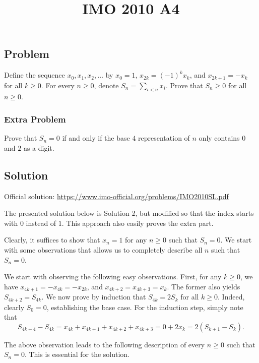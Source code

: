 \documentclass{article}
\title{IMO 2010 A4}
\author{}
\date{}
\begin{document}
\maketitle



\subsection*{Problem}

Define the sequence $x_0, x_1, x_2, \ldots$ by $x_0 = 1$, $x_{2k} = (-1)^k x_k$, and $x_{2k + 1} = -x_k$ for all $k \geq 0$.
For every $n \geq 0$, denote $S_n = \displaystyle \sum_{i < n} x_i$.
Prove that $S_n \geq 0$ for all $n \geq 0$.


\subsubsection*{Extra Problem}

Prove that $S_n = 0$ if and only if the base $4$ representation of $n$ only contains $0$ and $2$ as a digit.



\subsection*{Solution}

Official solution: \url{https://www.imo-official.org/problems/IMO2010SL.pdf}

The presented solution below is Solution 2, but modified so that the index starts with $0$ instead of $1$.
This approach also easily proves the extra part.

Clearly, it suffices to show that $x_n = 1$ for any $n \geq 0$ such that $S_n = 0$.
We start with some observations that allows us to completely describe all $n$ such that $S_n = 0$.

We start with observing the following easy observations.
First, for any $k \geq 0$, we have $x_{4k + 1} = -x_{4k} = -x_{2k}$, and $x_{4k + 2} = x_{4k + 3} = x_k$.
The former also yields $S_{4k + 2} = S_{4k}$.
We now prove by induction that $S_{4k} = 2 S_k$ for all $k \geq 0$.
Indeed, clearly $S_0 = 0$, establishing the base case.
For the induction step, simply note that
\[ S_{4k + 4} - S_{4k} = x_{4k} + x_{4k + 1} + x_{4k + 2} + x_{4k + 3} = 0 + 2 x_k = 2 (S_{k + 1} - S_k). \]

The above observation leads to the following description of every $n \geq 0$ such that $S_n = 0$.
This is essential for the solution.
\end{document}
